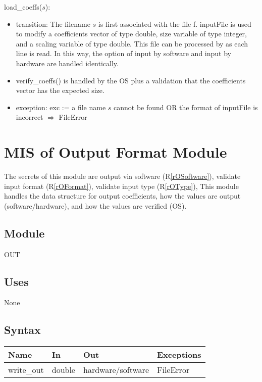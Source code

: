 \documentclass[12pt, titlepage]{article}
\newcommand{\rref}[1]{(R\ref{#1})}
\begin{document}
\noindent load\_coeffs($s$):
\begin{itemize}
\item transition: The filename $s$ is first associated with the file f.  {inputFile} is used to
  modify a coefficients vector of type double, size variable of type integer, and a scaling variable
  of type double. This file can be processed by  as each line is read.
  In this way, the option of input by software and input by hardware are handled identically.
\item verify\_coeffs() is handled by the OS plus a validation that the coefficients vector has the
  expected size.
\item exception: exc := a file name $s$ cannot be found OR the format of
  inputFile is incorrect $\Rightarrow$  FileError
\end{itemize}

\section{MIS of Output Format Module} \label{sc:MIS_OUT}

The secrets of this module are
 output via software \rref{rOSoftware},
 validate input format \rref{rOFormat},
 validate input type \rref{rOType},
This module handles the data structure for output coefficients,
 how the values are output (software/hardware),
 and how the values are verified (OS).

\subsection{Module}

OUT

\subsection{Uses}

None

\subsection{Syntax}

\begin{tabular}{p{3cm} p{2cm} p{4cm} >{\raggedright\arraybackslash}p{9cm}}
\toprule
\textbf{Name} & \textbf{In} & \textbf{Out} & \textbf{Exceptions} \\
\midrule
write\_out & double & hardware/software &  FileError \\
\bottomrule
\end{tabular}
\end{document}
